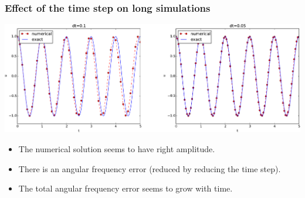 \documentclass{beamer}
\begin{document}
\begin{frame}
\frametitle{Effect of the time step on long simulations}

\centerline{\includegraphics[width=1.0\linewidth]{fig-vib/vib_freq_err1.pdf}}




\begin{itemize}
 \item The numerical solution seems to have right amplitude.

 \item There is an angular frequency error (reduced by reducing the time step).

 \item The total angular frequency error seems to grow with time.
\end{itemize}

\noindent
\end{frame}
\end{document}
